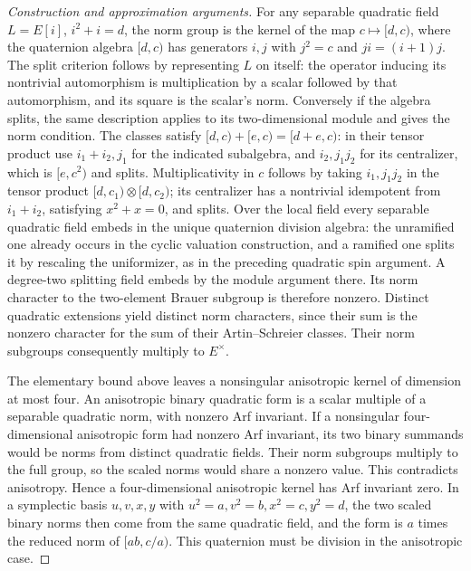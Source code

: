 \documentclass[11pt,a4paper,openany,oneside]{book}
\theoremstyle{resultstyle}
\theoremstyle{definition}
\numberwithin{equation}{chapter}
\begin{document}
\begin{proof}[Construction and approximation arguments]
For any separable quadratic field \(L=E[i]\), \(i^2+i=d\),
the norm group is the kernel of the map \(c\mapsto[d,c)\),
where the quaternion algebra \([d,c)\) has generators
\(i,j\) with \(j^2=c\) and \(ji=(i+1)j\). The split criterion
follows by representing \(L\) on itself: the operator
inducing its nontrivial automorphism is multiplication by
a scalar followed by that automorphism, and its square is the
scalar's norm. Conversely if the algebra splits, the same
description applies to its two-dimensional module and gives
the norm condition. The classes satisfy
\([d,c)+[e,c)=[d+e,c)\): in their tensor product use \(i_1+i_2,j_1\)
for the indicated subalgebra, and \(i_2,j_1j_2\) for its
centralizer, which is \([e,c^2)\) and splits. Multiplicativity
in \(c\) follows by taking \(i_1,j_1j_2\) in the tensor product
\([d,c_1)\otimes[d,c_2)\); its centralizer has a nontrivial
idempotent from \(i_1+i_2\), satisfying \(x^2+x=0\), and splits.
Over the local field every separable quadratic field embeds
in the unique quaternion division algebra: the unramified
one already occurs in the cyclic valuation construction, and
a ramified one splits it by rescaling the uniformizer, as in
the preceding quadratic spin argument. A degree-two splitting
field embeds by the module argument there. Its norm character
to the two-element Brauer subgroup is therefore nonzero.
Distinct quadratic extensions yield distinct norm characters,
since their sum is the nonzero character for the sum of their
Artin--Schreier classes. Their norm subgroups consequently
multiply to \(E^\times\).

The elementary bound above leaves a nonsingular anisotropic
kernel of dimension at most four. An anisotropic binary
quadratic form is a scalar multiple of a separable quadratic
norm, with nonzero Arf invariant. If a nonsingular
four-dimensional anisotropic form had nonzero Arf invariant,
its two binary summands would be norms from distinct
quadratic fields. Their norm subgroups multiply to the full
group, so the scaled norms would share a nonzero value. This
contradicts anisotropy. Hence a four-dimensional anisotropic
kernel has Arf invariant zero. In a symplectic basis \(u,v,x,y\)
with \(u^2=a,v^2=b,x^2=c,y^2=d\), the two scaled binary norms
then come from the same quadratic field, and the form is
\(a\) times the reduced norm of \([ab,c/a)\). This quaternion
must be division in the anisotropic case.


\end{proof}
\end{document}
